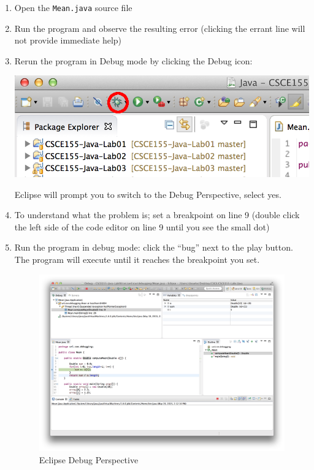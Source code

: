 \documentclass[12pt]{scrartcl}
\begin{document}
\begin{enumerate}
  \item Open the \texttt{Mean.java} source file 
  \item Run the program and observe the resulting error (clicking the errant line 
  	will not provide immediate help)
  \item Rerun the program in Debug mode by clicking the Debug icon: 
  	\begin{center}
	\includegraphics[scale=.75]{eclipseDebugIconMarkUp}
	\end{center}
	Eclipse will prompt you to switch to the Debug Perspective, select yes.
  \item To understand what the problem is; set a breakpoint on line 9 (double click the 
  	left side of the code editor on line 9 until you see the small dot)
  \item Run the program in debug mode: click the ``bug'' next to the play button.  The 
	program will execute until it reaches the breakpoint you set.
	
\begin{figure}[h]
\centering
\includegraphics[scale=.35]{eclipseDebugPerspective}
\caption{Eclipse Debug Perspective}
\label{figure:eclipseDebugPerspective}
\end{figure}


\end{enumerate}
\end{document}
